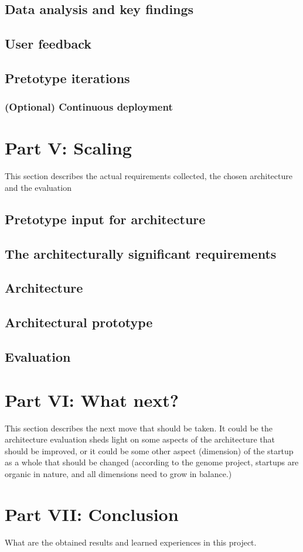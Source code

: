 \documentclass[a4paper,10pt]{article}
\begin{document}
\subsection{Data analysis and key findings}
\subsection{User feedback}
\subsection{Pretotype iterations}
\subsubsection{(Optional) Continuous deployment}


\section{Part V: Scaling}
This section describes the actual requirements collected, the chosen architecture and the evaluation
\subsection{Pretotype input for architecture}
\subsection{The architecturally significant requirements}
\subsection{Architecture}
\subsection{Architectural prototype}
\subsection{Evaluation}

\section{Part VI: What next?}
This section describes the next move that should be taken. It could be the architecture evaluation sheds light on some aspects of the architecture that should be improved, or it could be some other aspect
 (dimension) of the startup as a whole that should be changed (according to the genome project, startups are organic in nature, and all dimensions need to grow in balance.)

\section{Part VII: Conclusion}
What are the obtained results and learned experiences in this project.
\end{document}
